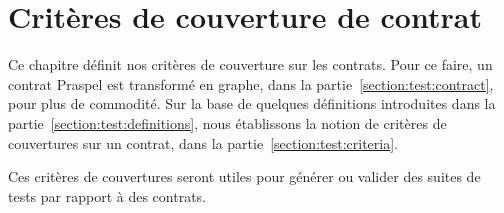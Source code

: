 \chapter{Critères de couverture de contrat}
\label{chapter:tests}

\minitoc

Ce chapitre définit nos critères de couverture sur les contrats. Pour ce faire,
un contrat Praspel est transformé en graphe, dans la
partie~\ref{section:test:contract}, pour plus de commodité. Sur la base de
quelques définitions introduites dans la partie~\ref{section:test:definitions},
nous établissons la notion de critères de couvertures sur un contrat, dans la
partie~\ref{section:test:criteria}.

Ces critères de couvertures seront utiles pour générer ou valider des
suites de tests par rapport à des contrats.

